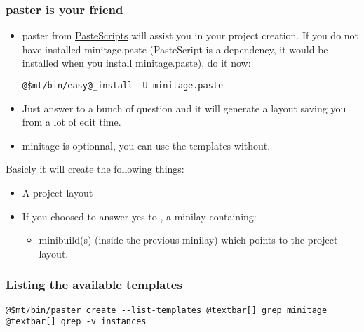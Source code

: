 \documentclass[letterpaper,10pt,english]{sphinxmanual}
\begin{document}
\subsubsection{paster is your friend}
\label{paster/projects/index:paster-is-your-friend}\begin{itemize}
\item {} 
paster from  \href{http://pypi.python.org/pypi/PasteScript/}{PasteScripts} will assist you in your project creation.
If you do not have installed minitage.paste (PasteScript is a dependency,
it would be installed when you install minitage.paste), do it now:

\begin{Verbatim}[commandchars=@\[\]]
@$mt/bin/easy@_install -U minitage.paste
\end{Verbatim}

\end{itemize}
\begin{itemize}
\item {} 
Just answer to a bunch of question and it will generate a layout saving you from a lot of edit time.

\item {} 
minitage is optionnal, you can use the templates without.

\end{itemize}

Basicly it will create the following things:
\begin{itemize}
\item {} 
A project layout

\item {} 
If you choosed to answer yes to , a minilay containing:
\begin{itemize}
\item {} 
minibuild(s) (inside the previous minilay) which points to the project layout.

\end{itemize}

\end{itemize}


\subsubsection{Listing the available templates}
\label{paster/projects/index:listing-the-available-templates}
\begin{Verbatim}[commandchars=@\[\]]
@$mt/bin/paster create --list-templates @textbar[] grep minitage @textbar[] grep -v instances
\end{Verbatim}
\end{document}
